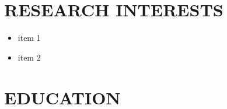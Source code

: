 \documentclass[10pt,a4paper,sans]{moderncv} %
\begin{document}
	
	\makecvtitle
	
	\section{RESEARCH INTERESTS}
	\begin{itemize}
		\item item 1
		\item item 2
	\end{itemize}
	
	\section{EDUCATION}
	
\end{document}
